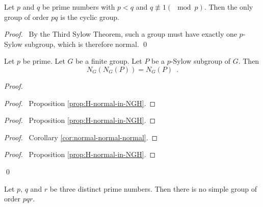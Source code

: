 \begin{cor}
Let $p$ and $q$ be prime numbers with $p < q$ and $q \not\equiv 1 (\mod p)$. Then the only group of order $pq$ is the cyclic group.
\end{cor}

\begin{proof}
\pf\ By the Third Sylow Theorem, such a group must have exactly one $p$-Sylow subgroup, which is therefore normal. \qed
\end{proof}

\begin{prop}
Let $p$ be prime. Let $G$ be a finite group. Let $P$ be a $p$-Sylow subgroup of $G$. Then
\[ N_G(N_G(P)) = N_G(P) \enspace . \]
\end{prop}

\begin{proof}
\pf
{}
\begin{proof}
	\pf\ Proposition \ref{prop:H-normal-in-NGH}.
\end{proof}
\begin{proof}
	\pf\ Proposition \ref{prop:H-normal-in-NGH}.
\end{proof}
\begin{proof}
	\pf\ Corollary \ref{cor:normal-normal-normal}.
\end{proof}
\begin{proof}
	\pf\ Proposition \ref{prop:H-normal-in-NGH}.
\end{proof}
\qed
\end{proof}

\begin{prop}
\label{prop:pqr-not-simple}
Let $p$, $q$ and $r$ be three distinct prime numbers.	Then there is no simple group of order $pqr$.
\end{prop}

